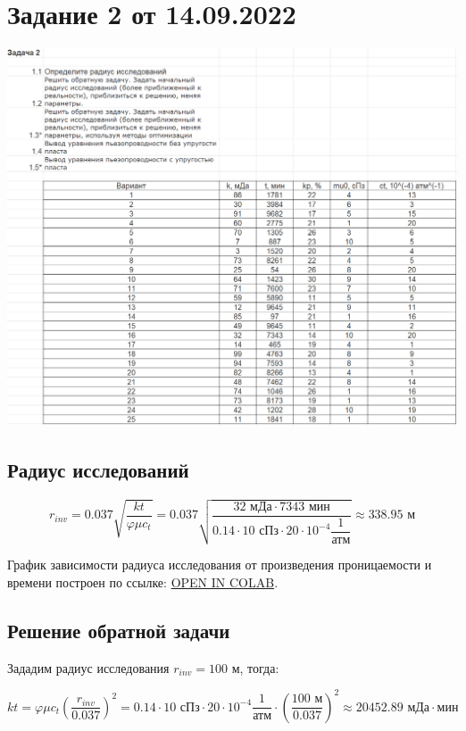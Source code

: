 \documentclass[a4paper,12pt]{article}
\newcommand{\beq}{\begin{equation}}
\newcommand{\eeq}{\end{equation}}
\begin{document}
\section{Задание 2 от 14.09.2022}
\includegraphics[width=\textwidth]{task2}

\subsection{Радиус исследований}

\beq
r_{inv}=0.037\sqrt{\frac{kt}{\varphi \mu c_t}}=0.037\sqrt{\frac{32\text{ мДа}\cdot 7343\text{ мин}}{0.14\cdot 10\text{ сПз}\cdot 20\cdot 10^{-4}\dfrac{\text{1}}{\text{атм}}}}\approx 338.95\text{ м}
\eeq

График зависимости радиуса исследования от произведения проницаемости и времени построен по ссылке: \href{https://colab.research.google.com/github/mualal/notebooks-source/blob/master/7_exploration_radius.ipynb}{OPEN IN COLAB}.

\subsection{Решение обратной задачи}

Зададим радиус исследования $r_{inv}=100\text{ м}$, тогда:

\beq
kt=\varphi\mu c_t\left(\dfrac{r_{inv}}{0.037}\right)^2=0.14\cdot 10\text{ сПз}\cdot 20\cdot 10^{-4}\frac{1}{\text{атм}}\cdot \left(\frac{100\text{ м}}{0.037}\right)^{\!2}\approx 20452.89\text{ мДа}\cdot\text{мин}
\eeq
\end{document}

